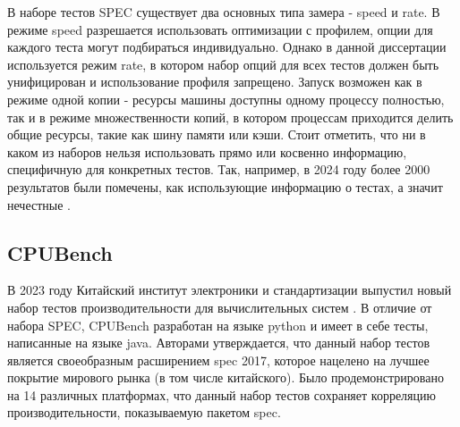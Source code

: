 В наборе тестов SPEC существует два основных типа замера - speed и rate. В режиме speed разрешается использовать оптимизации с профилем, опции для каждого теста могут подбираться индивидуально. Однако в данной диссертации используется режим rate, в котором набор опций для всех тестов должен быть унифицирован и использование профиля запрещено. Запуск возможен как в режиме  одной копии - ресурсы машины доступны одному процессу полностью, так и  в режиме множественности копий, в котором процессам приходится делить общие ресурсы, такие как шину памяти или кэши. Стоит отметить, что ни в каком из наборов нельзя использовать прямо или косвенно информацию, специфичную для конкретных тестов. Так, например, в 2024 году более 2000 результатов  были помечены, как использующие информацию о тестах, а значит нечестные \cite{cliffFlagged}.

\subsection{CPUBench}\label{p1:tests:cpubench}

В 2023 году Китайский институт электроники и стандартизации выпустил новый набор тестов производительности для вычислительных систем \cite{lu2023cpubench}. В отличие от набора SPEC, CPUBench разработан на языке python и имеет в себе тесты, написанные на языке java. Авторами утверждается, что данный набор тестов является своеобразным расширением spec 2017, которое нацелено на лучшее покрытие мирового рынка (в том числе китайского). Было продемонстрировано на 14 различных платформах, что данный набор тестов сохраняет корреляцию производительности, показываемую пакетом spec.

